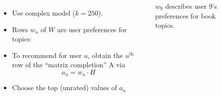 \documentclass[handout]{beamer}
\begin{document}
\begin{columns}
 \begin{itemize}[<+->]
\item Use complex model ($k=250$).\vfill
\item Rows $w_u$ of $W$ are user preferences for topics:\vfill
\item To recommend for user $u$,
obtain the $u^{\text{th}}$ row of the ``matrix completion'' A via
\[a_u = w_u \cdot H\]
\item Choose the top (unrated) values of $a_u$
\end{itemize}
 \begin{table}
\centering
  
  \caption[User Profile]{$w_9$ describes user 9's preferences for book topics.}
  \label{tab:user-profile-9}
\end{table}
\end{columns}
\end{document}
